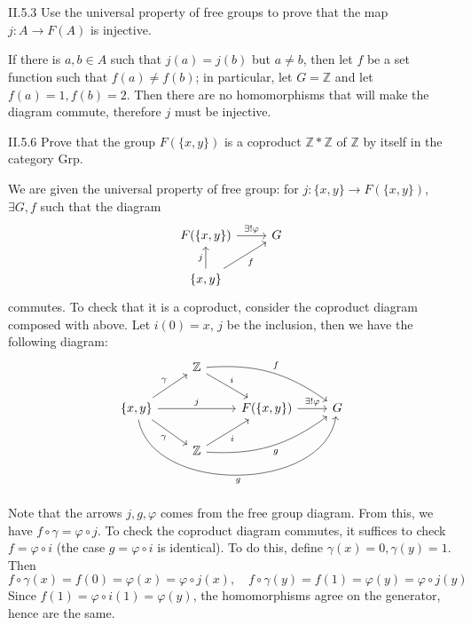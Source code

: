 \section{}

\begin{problem}{II.5.3}
Use the universal property of free groups to prove that the map $j:A \to F(A)$ is injective.
\end{problem}
\begin{pf}
If there is $a,b \in A$ such that $j(a) = j(b)$ but $a \neq b$, then let $f$ be a set function such that $f(a) \neq f(b)$; in particular, let $G = \mathbb{Z}$ and let $f(a) = 1, f(b) = 2$. Then there are no homomorphisms that will make the diagram commute, therefore $j$ must be injective. 
\end{pf}

\begin{problem}{II.5.6}
Prove that the group $F(\{x,y\})$ is a coproduct $\mathbb{Z} * \mathbb{Z}$ of $\mathbb{Z}$ by itself in the category \textsf{Grp}.
\end{problem}
\begin{pf}
We are given the universal property of free group: for $j:\{x,y\} \to F(\{x,y\})$, $\exists G, f$ such that the diagram
\[
\begin{tikzcd}
{F(\{x,y\})} \arrow[r, "\exists ! \varphi"] & G \\
{\{x,y\}} \arrow[u, "j"] \arrow[ru, "f"']   &  
\end{tikzcd}
\]
commutes. To check that it is a coproduct, consider the coproduct diagram composed with above. Let $i(0)=x$, $j$ be the inclusion, then we have the following diagram:
\[
\begin{tikzcd}
& \Z \arrow[rd, "i"] \arrow[rrd, "f", bend left=20] &  &   \\
{\{x,y\}} \arrow[rr, "j"] \arrow[ru, "\gamma"] \arrow[rd, "\gamma"'] \arrow[rrr, "g"', bend right=80] &  & {F(\{x,y\})} \arrow[r, "\exists ! \varphi"] & G \\
& \Z \arrow[ru, "i"'] \arrow[rru, "g"', bend right=20]
\end{tikzcd}
\]
Note that the arrows $j, g, \varphi$ comes from the free group diagram. From this, we have $f \circ \gamma = \varphi \circ j$.
To check the coproduct diagram commutes, it suffices to check $f = \varphi \circ i$ (the case $g = \varphi \circ i$ is identical). To do this, define $\gamma(x) = 0, \gamma(y) = 1$. Then 
\[
f \circ \gamma (x) = f(0) = \varphi (x) = \varphi \circ j(x), \quad f \circ \gamma (y) = f(1) = \varphi (y) = \varphi \circ j(y)
\]
Since $f(1) = \varphi \circ i (1) = \varphi (y)$, the homomorphisms agree on the generator, hence are the same. 
\end{pf}

